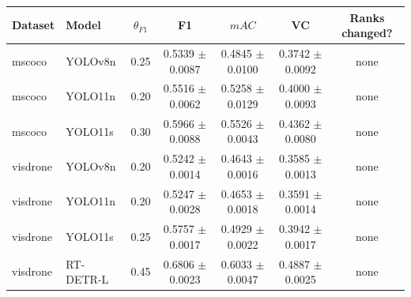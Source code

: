 \begin{tabular}{llccccc}
\toprule
Dataset & Model & $\theta_{F1}$ & F1 & $mAC$ & VC & Ranks changed? \\
\midrule
mscoco & YOLOv8n & 0.25 & 0.5339 $\pm$ 0.0087 & 0.4845 $\pm$ 0.0100 & 0.3742 $\pm$ 0.0092 & none \\
mscoco & YOLO11n & 0.20 & 0.5516 $\pm$ 0.0062 & 0.5258 $\pm$ 0.0129 & 0.4000 $\pm$ 0.0093 & none \\
mscoco & YOLO11s & 0.30 & 0.5966 $\pm$ 0.0088 & 0.5526 $\pm$ 0.0043 & 0.4362 $\pm$ 0.0080 & none \\
visdrone & YOLOv8n & 0.20 & 0.5242 $\pm$ 0.0014 & 0.4643 $\pm$ 0.0016 & 0.3585 $\pm$ 0.0013 & none \\
visdrone & YOLO11n & 0.20 & 0.5247 $\pm$ 0.0028 & 0.4653 $\pm$ 0.0018 & 0.3591 $\pm$ 0.0014 & none \\
visdrone & YOLO11s & 0.25 & 0.5757 $\pm$ 0.0017 & 0.4929 $\pm$ 0.0022 & 0.3942 $\pm$ 0.0017 & none \\
visdrone & RT-DETR-L & 0.45 & 0.6806 $\pm$ 0.0023 & 0.6033 $\pm$ 0.0047 & 0.4887 $\pm$ 0.0025 & none \\
\bottomrule
\end{tabular}
